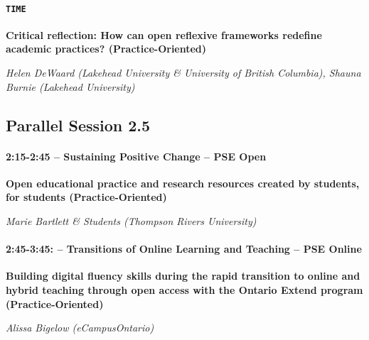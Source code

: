\documentclass[
]{book}
\begin{document}
\begin{secondary}
\hypertarget{time}{%
\paragraph{\texorpdfstring{\texttt{TIME}}{TIME}}\label{time}}

\textbf{Critical reflection: How can open reflexive frameworks redefine
academic practices? (Practice-Oriented)}

\emph{Helen DeWaard (Lakehead University \& University of British
Columbia), Shauna Burnie (Lakehead University)}
\end{secondary}

\hypertarget{parallel-session-2.5}{%
\subsection*{Parallel Session 2.5}\label{parallel-session-2.5}}

\begin{secondary}
\hypertarget{sustaining-positive-change-pse-open}{%
\paragraph*{2:15-2:45 -- Sustaining Positive Change -- PSE
Open}\label{sustaining-positive-change-pse-open}}

\textbf{Open educational practice and research resources created by
students, for students (Practice-Oriented)}

\emph{Marie Bartlett \& Students (Thompson Rivers University)}
\end{secondary}

\begin{secondary}
\hypertarget{transitions-of-online-learning-and-teaching-pse-online}{%
\paragraph*{2:45-3:45: -- Transitions of Online Learning and Teaching --
PSE
Online}\label{transitions-of-online-learning-and-teaching-pse-online}}

\textbf{Building digital fluency skills during the rapid transition to
online and hybrid teaching through open access with the Ontario Extend
program (Practice-Oriented)}

\emph{Alissa Bigelow (eCampusOntario)}
\end{secondary}
\end{document}
